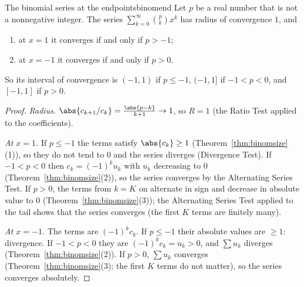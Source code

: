 \documentclass[11pt]{article}
\begin{document}
\begin{thm}{The binomial series at the endpoints}{binomend}
Let $p$ be a real number that is not a nonnegative integer. The series $\sum_{k=0}^\infty\binom pkx^k$ has radius of convergence $1$, and
\begin{enumerate}
  \item at $x=1$ it converges if and only if $p>-1$;
  \item at $x=-1$ it converges if and only if $p>0$.
\end{enumerate}
So its interval of convergence is $(-1,1)$ if $p\le-1$, $(-1,1]$ if $-1<p<0$, and $[-1,1]$ if $p>0$.
\end{thm}
\begin{proof}
\emph{Radius.} $\abs{c_{k+1}/c_k}=\frac{\abs{p-k}}{k+1}\to1$, so $R=1$ (the Ratio Test applied to the coefficients).

\emph{At $x=1$.} If $p\le-1$ the terms satisfy $\abs{c_k}\ge1$ (Theorem~\ref{thm:binomsize}(1)), so they do not tend to $0$ and the series diverges (Divergence Test). If $-1<p<0$ then $c_k=(-1)^ku_k$ with $u_k$ decreasing to $0$ (Theorem~\ref{thm:binomsize}(2)), so the series converges by the Alternating Series Test. If $p>0$, the terms from $k=K$ on alternate in sign and decrease in absolute value to $0$ (Theorem~\ref{thm:binomsize}(3)); the Alternating Series Test applied to the tail shows that the series converges (the first $K$ terms are finitely many).

\emph{At $x=-1$.} The terms are $(-1)^kc_k$. If $p\le-1$ their absolute values are $\ge1$: divergence. If $-1<p<0$ they are $(-1)^kc_k=u_k>0$, and $\sum u_k$ diverges (Theorem~\ref{thm:binomsize}(2)). If $p>0$, $\sum u_k$ converges (Theorem~\ref{thm:binomsize}(3); the first $K$ terms do not matter), so the series converges absolutely.
\end{proof}
\end{document}
